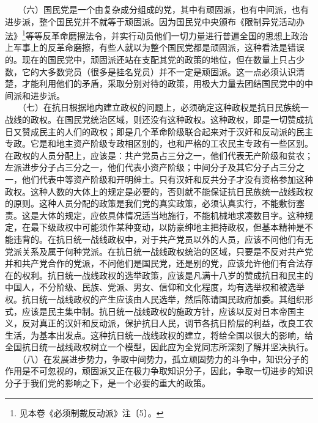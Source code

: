 \documentclass[cn,11pt,chinese]{elegantbook}
\begin{document}
　　（六）国民党是一个由复杂成分组成的党，其中有顽固派，也有中间派，也有进步派，整个国民党并不就等于顽固派。因为国民党中央颁布《限制异党活动办法》\footnote[2]{ 见本卷《必须制裁反动派》注〔5〕。}等等反革命磨擦法令，并实行动员他们一切力量进行普遍全国的思想上政治上军事上的反革命磨擦，有些人就以为整个国民党都是顽固派，这种看法是错误的。现在的国民党中，顽固派还站在支配其党的政策的地位，但在数量上只占少数，它的大多数党员（很多是挂名党员）并不一定是顽固派。这一点必须认识清楚，才能利用他们的矛盾，采取分别对待的政策，用极大力量去团结国民党中的中间派和进步派。\\
　　（七）在抗日根据地内建立政权的问题上，必须确定这种政权是抗日民族统一战线的政权。在国民党统治区域，则还没有这种政权。这种政权，即是一切赞成抗日又赞成民主的人们的政权；即是几个革命阶级联合起来对于汉奸和反动派的民主专政。它是和地主资产阶级专政相区别的，也和严格的工农民主专政有一些区别。在政权的人员分配上，应该是：共产党员占三分之一，他们代表无产阶级和贫农；左派进步分子占三分之一，他们代表小资产阶级；中间分子及其它分子占三分之一，他们代表中等资产阶级和开明绅士。只有汉奸和反共分子才没有资格参加这种政权。这种人数的大体上的规定是必要的，否则就不能保证抗日民族统一战线政权的原则。这种人员分配的政策是我们党的真实政策，必须认真实行，不能敷衍塞责。这是大体的规定，应依具体情况适当地施行，不能机械地求凑数目字。这种规定，在最下级政权中可能须作某种变动，以防豪绅地主把持政权，但基本精神是不能违背的。在抗日统一战线政权中，对于共产党员以外的人员，应该不问他们有无党派关系及属于何种党派。在抗日统一战线政权统治的区域，只要是不反对共产党并和共产党合作的党派，不问他们是国民党，还是别的党，应该允许他们有合法存在的权利。抗日统一战线政权的选举政策，应该是凡满十八岁的赞成抗日和民主的中国人，不分阶级、民族、党派、男女、信仰和文化程度，均有选举权和被选举权。抗日统一战线政权的产生应该由人民选举，然后陈请国民政府加委。其组织形式，应该是民主集中制。抗日统一战线政权的施政方针，应该以反对日本帝国主义，反对真正的汉奸和反动派，保护抗日人民，调节各抗日阶层的利益，改良工农生活，为基本出发点。这种抗日统一战线政权的建立，将给全国以很大的影响，给全国抗日统一战线政权树立一个模型，因此应为全党同志所深刻了解并坚决执行。\\
　　（八）在发展进步势力，争取中间势力，孤立顽固势力的斗争中，知识分子的作用是不可忽视的，顽固派又正在极力争取知识分子，因此，争取一切进步的知识分子于我们党的影响之下，是一个必要的重大的政策。\\
\end{document}
